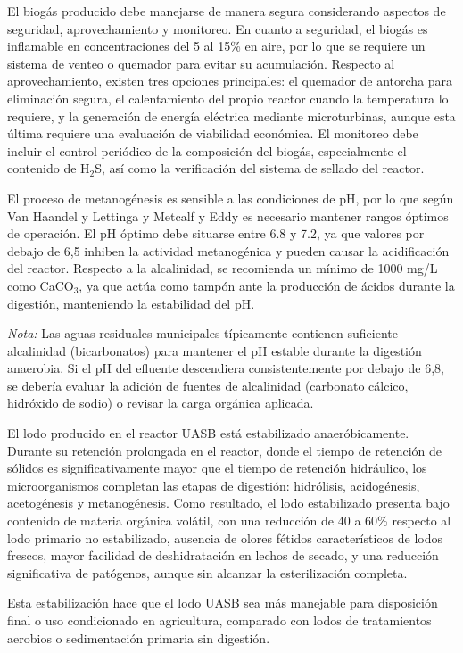\documentclass[12pt,a4paper]{article}
\begin{document}
El biogás producido debe manejarse de manera segura considerando aspectos de seguridad, aprovechamiento y monitoreo. En cuanto a seguridad, el biogás es inflamable en concentraciones del 5 al 15\% en aire, por lo que se requiere un sistema de venteo o quemador para evitar su acumulación. Respecto al aprovechamiento, existen tres opciones principales: el quemador de antorcha para eliminación segura, el calentamiento del propio reactor cuando la temperatura lo requiere, y la generación de energía eléctrica mediante microturbinas, aunque esta última requiere una evaluación de viabilidad económica. El monitoreo debe incluir el control periódico de la composición del biogás, especialmente el contenido de H$_2$S, así como la verificación del sistema de sellado del reactor.

El proceso de metanogénesis es sensible a las condiciones de pH, por lo que según Van Haandel y Lettinga \cite{vanhaandel1994} y Metcalf y Eddy \cite{metcalf2014} es necesario mantener rangos óptimos de operación. El pH óptimo debe situarse entre 6.8 y 7.2, ya que valores por debajo de 6,5 inhiben la actividad metanogénica y pueden causar la acidificación del reactor. Respecto a la alcalinidad, se recomienda un mínimo de 1000 mg/L como CaCO$_3$, ya que actúa como tampón ante la producción de ácidos durante la digestión, manteniendo la estabilidad del pH.

\textit{Nota:} Las aguas residuales municipales típicamente contienen suficiente alcalinidad (bicarbonatos) para mantener el pH estable durante la digestión anaerobia. Si el pH del efluente descendiera consistentemente por debajo de 6,8, se debería evaluar la adición de fuentes de alcalinidad (carbonato cálcico, hidróxido de sodio) o revisar la carga orgánica aplicada.

El lodo producido en el reactor UASB está estabilizado anaeróbicamente. Durante su retención prolongada en el reactor, donde el tiempo de retención de sólidos es significativamente mayor que el tiempo de retención hidráulico, los microorganismos completan las etapas de digestión: hidrólisis, acidogénesis, acetogénesis y metanogénesis. Como resultado, el lodo estabilizado presenta bajo contenido de materia orgánica volátil, con una reducción de 40 a 60\% respecto al lodo primario no estabilizado, ausencia de olores fétidos característicos de lodos frescos, mayor facilidad de deshidratación en lechos de secado, y una reducción significativa de patógenos, aunque sin alcanzar la esterilización completa.

Esta estabilización hace que el lodo UASB sea más manejable para disposición final o uso condicionado en agricultura, comparado con lodos de tratamientos aerobios o sedimentación primaria sin digestión.
\end{document}
